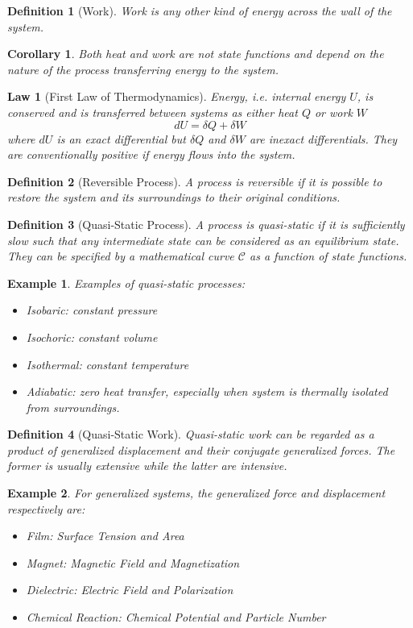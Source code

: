 \documentclass[a4paper]{article}
\newtheorem{eg}{Example}[section]
\theoremstyle{new}
\newtheorem{law}{Law}[section]
\newtheorem{defi}{Definition}[section]
\newtheorem{cor}{Corollary}[section]
\begin{document}
\begin{defi}[Work]
Work is any other kind of energy across the wall of the system.
\end{defi}
\begin{cor}
Both heat and work are not state functions and depend on the nature of the process transferring energy to the system.
\end{cor}
\begin{law}[First Law of Thermodynamics]
Energy, i.e. internal energy $U$, is conserved and is transferred between systems as either heat $Q$ or work $W$
\begin{equation}
dU=\delta Q+\delta W\label{firstlaw}
\end{equation}
where $dU$ is an exact differential but $\delta Q$ and $\delta W$ are inexact differentials. They are conventionally positive if energy flows into the system.
\end{law}
\begin{defi}[Reversible Process]
A process is reversible if it is possible to restore the system and its surroundings to their original conditions.
\end{defi}
\begin{defi}[Quasi-Static Process]
A process is quasi-static if it is sufficiently slow such that any intermediate state can be considered as an equilibrium state. They can be specified by a mathematical curve $\mathcal{C}$ as a function of state functions.
\end{defi}
\begin{eg}
Examples of quasi-static processes:
\begin{itemize}
    \item Isobaric: constant pressure
    \item Isochoric: constant volume
    \item Isothermal: constant temperature
    \item Adiabatic: zero heat transfer, especially when system is thermally isolated from surroundings.
\end{itemize}
\end{eg}
\begin{defi}[Quasi-Static Work]
Quasi-static work can be regarded as a product of generalized displacement and their conjugate generalized forces. The former is usually extensive while the latter are intensive.
\end{defi}
\begin{eg}
For generalized systems, the generalized force and displacement respectively are: 
\begin{itemize}
    \item Film: Surface Tension and Area
    \item Magnet: Magnetic Field and Magnetization
    \item Dielectric: Electric Field and Polarization
    \item Chemical Reaction: Chemical Potential and Particle Number
\end{itemize}
\end{eg}
\end{document}
